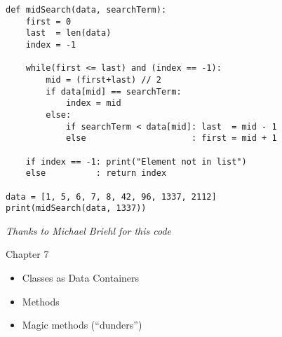 
\begin{frame}[fragile]
%
\begin{codebox}
\begin{verbatim}
def midSearch(data, searchTerm):
    first = 0
    last  = len(data)
    index = -1
    
    while(first <= last) and (index == -1):
        mid = (first+last) // 2
        if data[mid] == searchTerm:
            index = mid
        else:
            if searchTerm < data[mid]: last  = mid - 1
            else                     : first = mid + 1

    if index == -1: print("Element not in list")
    else          : return index

data = [1, 5, 6, 7, 8, 42, 96, 1337, 2112]
print(midSearch(data, 1337))
\end{verbatim}
\end{codebox}
%
\begin{flushright}
\scriptsize \emph{Thanks to Michael Briehl for this code}
\end{flushright}
%
\end{frame}


\begin{frame}[fragile]{Chapter 7}
%
\begin{itemize}
\item Classes as Data Containers
\item Methods
\item Magic methods (\enquote{dunders})
\end{itemize}
%
\end{frame}


